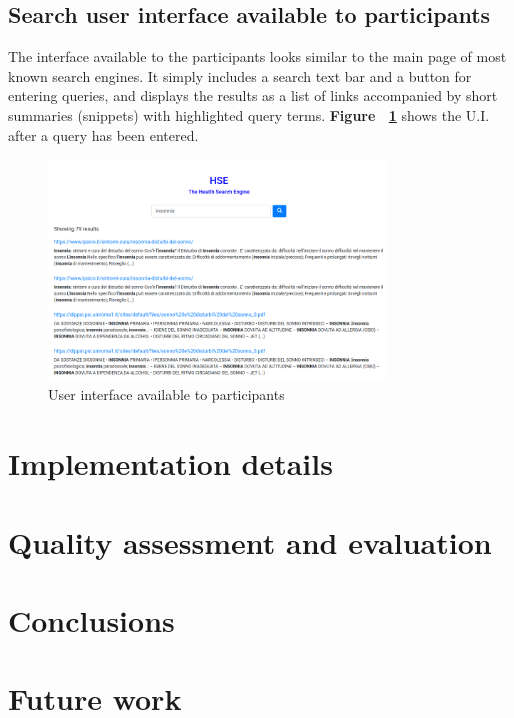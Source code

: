 \documentclass[]{usiinfbachelorproject}
\begin{document}
\subsection{Search user interface available to participants}

The interface available to the participants looks similar to the main page of most known search engines. It simply
includes a search text bar and a button for entering queries, and displays the results as a list of
links accompanied by short summaries (snippets) with highlighted query terms. 
\textbf{Figure ~\ref{fig:searchUi}} shows the U.I. after a query has been entered.

\begin{figure} [h]
\centering
\includegraphics[width=0.8\textwidth]{img/searchUi}
\caption{User interface available to participants}
\label{fig:searchUi}
\end{figure}




\section{Implementation details} \label{implementation}

\TODO{}


\section{Quality assessment and evaluation} \label{evaluation}

\TODO{}

\section{Conclusions} \label{conclusions}

\TODO{}

\section{Future work} \label{futureWork}

\TODO{}



\newpage



\end{document}
